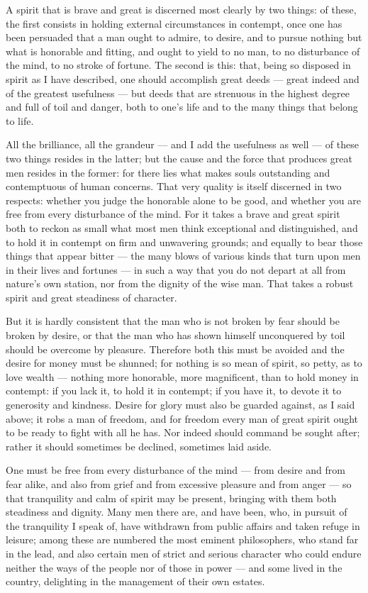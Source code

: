  A spirit that is brave and great is discerned most clearly by two things: of these, the first consists in holding external circumstances in contempt, once one has been persuaded that a man ought to admire, to desire, and to pursue nothing but what is honorable and fitting, and ought to yield to no man, to no disturbance of the mind, to no stroke of fortune. The second is this: that, being so disposed in spirit as I have described, one should accomplish great deeds — great indeed and of the greatest usefulness — but deeds that are strenuous in the highest degree and full of toil and danger, both to one's life and to the many things that belong to life.

 All the brilliance, all the grandeur — and I add the usefulness as well — of these two things resides in the latter; but the cause and the force that produces great men resides in the former: for there lies what makes souls outstanding and contemptuous of human concerns. That very quality is itself discerned in two respects: whether you judge the honorable alone to be good, and whether you are free from every disturbance of the mind. For it takes a brave and great spirit both to reckon as small what most men think exceptional and distinguished, and to hold it in contempt on firm and unwavering grounds; and equally to bear those things that appear bitter — the many blows of various kinds that turn upon men in their lives and fortunes — in such a way that you do not depart at all from nature's own station, nor from the dignity of the wise man. That takes a robust spirit and great steadiness of character.

 But it is hardly consistent that the man who is not broken by fear should be broken by desire, or that the man who has shown himself unconquered by toil should be overcome by pleasure. Therefore both this must be avoided and the desire for money must be shunned; for nothing is so mean of spirit, so petty, as to love wealth — nothing more honorable, more magnificent, than to hold money in contempt: if you lack it, to hold it in contempt; if you have it, to devote it to generosity and kindness. Desire for glory must also be guarded against, as I said above; it robs a man of freedom, and for freedom every man of great spirit ought to be ready to fight with all he has. Nor indeed should command be sought after; rather it should sometimes be declined, sometimes laid aside.

 One must be free from every disturbance of the mind — from desire and from fear alike, and also from grief and from excessive pleasure and from anger — so that tranquility and calm of spirit may be present, bringing with them both steadiness and dignity. Many men there are, and have been, who, in pursuit of the tranquility I speak of, have withdrawn from public affairs and taken refuge in leisure; among these are numbered the most eminent philosophers, who stand far in the lead, and also certain men of strict and serious character who could endure neither the ways of the people nor of those in power — and some lived in the country, delighting in the management of their own estates.

